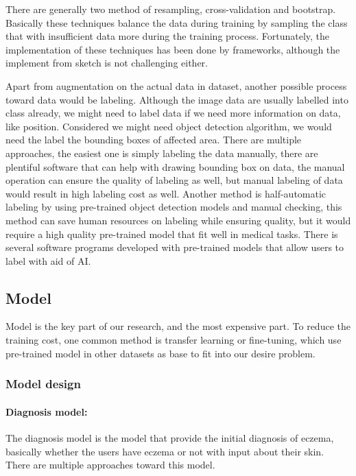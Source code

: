                 There are generally two method of resampling, cross-validation and bootstrap. Basically these techniques balance the data during training by sampling the class that with insufficient data more during the training process. Fortunately, the implementation of these techniques has been done by frameworks, although the implement from sketch is not challenging either.

                Apart from augmentation on the actual data in dataset, another possible process toward data would be labeling. Although the image data are usually labelled into class already, we might need to label data if we need more information on data, like position. Considered we might need object detection algorithm, we would need the label the bounding boxes of affected area. There are multiple approaches, the easiest one is simply labeling the data manually, there are plentiful software that can help with drawing bounding box on data, the manual operation can ensure the quality of labeling as well, but manual labeling of data would result in high labeling cost as well. Another method is half-automatic labeling by using pre-trained object detection models and manual checking, this method can save human resources on labeling while ensuring quality, but it would require a high quality pre-trained model that fit well in medical tasks. There is several software programs developed with pre-trained models that allow users to label with aid of AI.
        \subsection{Model}

            Model is the key part of our research, and the most expensive part. To reduce the training cost, one common method is transfer learning or fine-tuning, which use pre-trained model in other datasets as base to fit into our desire problem.

            \subsubsection{Model design}
                \paragraph{Diagnosis model:}
                    The diagnosis model is the model that provide the initial diagnosis of eczema, basically whether the users have eczema or not with input about their skin. There are multiple approaches toward this model.

